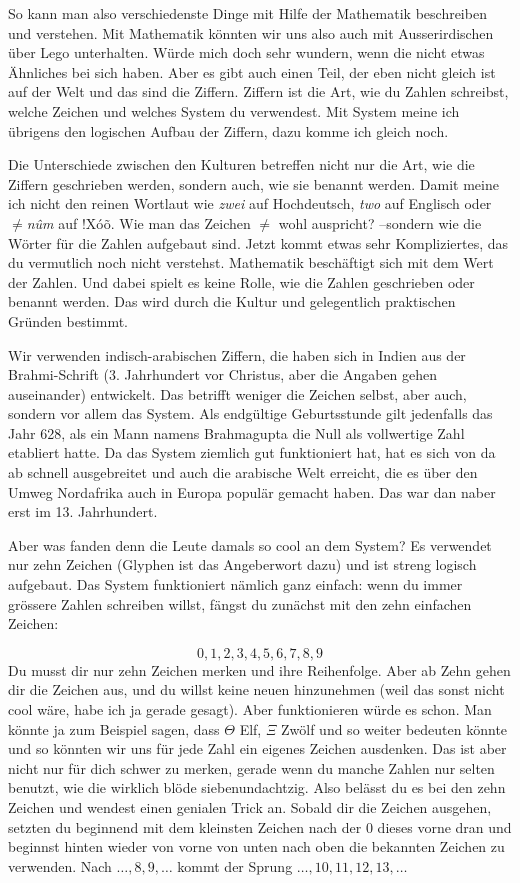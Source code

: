 So kann man also verschiedenste Dinge mit Hilfe der Mathematik beschreiben und verstehen. Mit Mathematik könnten wir uns also auch mit Ausserirdischen über Lego unterhalten. Würde mich doch sehr wundern, wenn die nicht etwas Ähnliches bei sich haben. Aber es gibt auch einen Teil, der eben nicht gleich ist auf der Welt und das sind die Ziffern. Ziffern ist die Art, wie du Zahlen schreibst, welche Zeichen und welches System du verwendest. Mit System meine ich übrigens den logischen Aufbau der Ziffern, dazu komme ich gleich noch.

Die Unterschiede zwischen den Kulturen betreffen nicht nur die Art, wie die Ziffern geschrieben werden, sondern auch, wie sie benannt werden. Damit meine ich nicht den reinen Wortlaut wie \textit{zwei} auf Hochdeutsch, \textit{two} auf Englisch oder \textit{$\neq$n\^{u}m} auf $!$X\'{o}\~{o}. Wie man das Zeichen $\neq$ wohl auspricht? --sondern wie die Wörter für die Zahlen aufgebaut sind. Jetzt kommt etwas sehr Kompliziertes, das du vermutlich noch nicht verstehst. Mathematik beschäftigt sich mit dem Wert der Zahlen. Und dabei spielt es keine Rolle, wie die Zahlen geschrieben oder benannt werden. Das wird durch die Kultur und gelegentlich praktischen Gründen bestimmt.

Wir verwenden indisch-arabischen Ziffern, die haben sich in Indien aus der Brahmi-Schrift (3. Jahrhundert vor Christus, aber die Angaben gehen auseinander) entwickelt. Das betrifft weniger die Zeichen selbst, aber auch, sondern vor allem das System. Als endgültige Geburtsstunde gilt jedenfalls das Jahr 628, als ein Mann namens Brahmagupta die Null als vollwertige Zahl etabliert hatte. Da das System ziemlich gut funktioniert hat, hat es sich von da ab schnell ausgebreitet und auch die arabische Welt erreicht, die es über den Umweg Nordafrika auch in Europa populär gemacht haben. Das war dan naber erst im 13. Jahrhundert.

Aber was fanden denn die Leute damals so cool an dem System? Es verwendet nur zehn Zeichen (Glyphen ist das Angeberwort dazu) und ist streng logisch aufgebaut. Das System funktioniert nämlich ganz einfach: wenn du immer grössere Zahlen schreiben willst, fängst du zunächst mit den zehn einfachen Zeichen:

$$0, 1, 2, 3, 4, 5, 6, 7, 8, 9$$
Du musst dir nur zehn Zeichen merken und ihre Reihenfolge. Aber ab Zehn gehen dir die Zeichen aus, und du willst keine neuen hinzunehmen (weil das sonst nicht cool wäre, habe ich ja gerade gesagt). Aber funktionieren würde es schon. Man könnte ja zum Beispiel sagen, dass $\Theta$ Elf, $\Xi$ Zwölf und so weiter bedeuten könnte und so könnten wir uns für jede Zahl ein eigenes Zeichen ausdenken. Das ist aber nicht nur für dich schwer zu merken, gerade wenn du manche Zahlen nur selten benutzt, wie die wirklich blöde siebenundachtzig. Also belässt du es bei den zehn Zeichen und wendest einen genialen Trick an. Sobald dir die Zeichen ausgehen, setzten du beginnend mit dem kleinsten Zeichen nach der $0$ dieses vorne dran und beginnst hinten wieder von vorne von unten nach oben die bekannten Zeichen zu verwenden. Nach $\dots, 8, 9,\dots$ kommt der Sprung $\dots, 10, 11, 12, 13,\dots$

